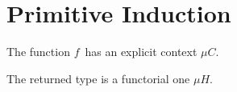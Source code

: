 \message{ !name(resumen.tex)}\documentclass{beamer}
\begin{document}
\section{Primitive Induction}
\label{sec:pimind}

\begin{frame} 
  {\scriptsize {}}
\end{frame}



\begin{frame}[shrink]
  The function $f$\ has an explicit context $\mu C$.

  The returned type is a functorial one $\mu H$.
  
  \hspace{5px}
  
  {\tiny {}}
\end{frame}



\end{document}
